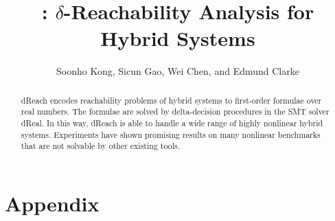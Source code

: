 \documentclass{llncs}
\title{\dReach{}: $\delta$-Reachability Analysis for Hybrid Systems}
\newcommand{\dReal}{\textsf{dReal}}
\newcommand{\dReach}{\textsf{dReach}}
\begin{document}
\mainmatter  %

\author{Soonho Kong, Sicun Gao, Wei Chen, and Edmund Clarke}
\maketitle

\begin{abstract}
  \dReach{} encodes reachability problems of hybrid systems to
  first-order formulae over real numbers. The formulae are solved by
  delta-decision procedures in the SMT solver \dReal{}. In this way,
  \dReach{} is able to handle a wide range of highly nonlinear hybrid
  systems. Experiments have shown promising results on many nonlinear
  benchmarks that are not solvable by other existing tools.
\end{abstract}










\section*{Appendix}

\end{document}
